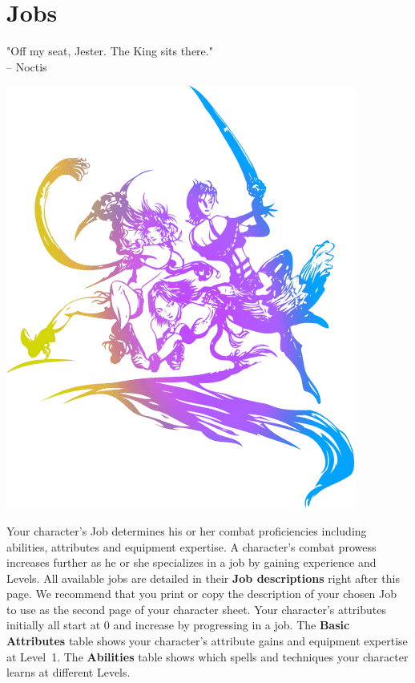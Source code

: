 \section*{\hypertarget{job}{Jobs}}
%
"Off my seat, Jester. The King sits there." \\
\indent -- Noctis 
%
\begin{center}
\includegraphics[width=\columnwidth]{./art/images/ff10-2.png} 
\end{center}
%
Your character's Job determines his or her combat proficiencies including abilities, attributes and equipment expertise.
A character's combat prowess increases further as he or she specializes in a job by gaining experience and Levels.
All available jobs are detailed in their \textbf{Job descriptions} right after this page.
We recommend that you print or copy the description of your chosen Job to use as the second page of your character sheet.
Your character's attributes initially all start at 0 and increase by progressing in a job.
The \textbf{Basic Attributes} table shows your character's attribute gains and equipment expertise at Level~1.
The \textbf{Abilities} table shows which spells and techniques your character learns at different Levels.

